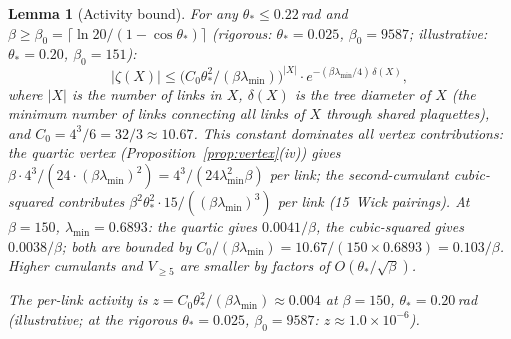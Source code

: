 \documentclass[11pt]{article}
\newtheorem{lemma}[theorem]{Lemma}
\theoremstyle{definition}
\begin{document}
\begin{lemma}[Activity bound]\label{lem:activity}
For any $\theta_*\le 0.22$\,rad and $\beta\ge\beta_0
=\lceil\ln 20/(1-\cos\theta_*)\rceil$
(rigorous: $\theta_*=0.025$, $\beta_0=9587$;
illustrative: $\theta_*=0.20$, $\beta_0=151$):
\begin{equation}
|\zeta(X)|\le\bigl(C_0\theta_*^2/(\beta\lambda_{\min})\bigr)^{|X|}
\cdot e^{-(\beta\lambda_{\min}/4)\,\delta(X)},
\end{equation}
where $|X|$ is the number of links in $X$, $\delta(X)$ is the
tree diameter of $X$ (the minimum number of links connecting all
links of $X$ through shared plaquettes), and
$C_0=4^3/6=32/3\approx 10.67$.  This constant dominates
all vertex contributions: the quartic vertex
(Proposition~\ref{prop:vertex}(iv)) gives
$\beta\cdot 4^3/(24\cdot(\beta\lambda_{\min})^2)
=4^3/(24\lambda_{\min}^2\beta)$ per link; the second-cumulant
cubic-squared contributes
$\beta^2\theta_*^2\cdot 15/((\beta\lambda_{\min})^3)$ per link
(15~Wick pairings).  At $\beta=150$, $\lambda_{\min}=0.6893$:
the quartic gives $0.0041/\beta$, the cubic-squared gives
$0.0038/\beta$; both are bounded by
$C_0/(\beta\lambda_{\min})=10.67/(150\times 0.6893)=0.103/\beta$.
Higher cumulants and $V_{\ge 5}$ are smaller by factors of
$O(\theta_*/\sqrt{\beta})$.

The per-link activity is $z=C_0\theta_*^2/(\beta\lambda_{\min})
\approx 0.004$ at $\beta=150$, $\theta_*=0.20$\,rad
(illustrative; at the rigorous $\theta_*=0.025$, $\beta_0=9587$:
$z\approx 1.0\times 10^{-6}$).
\end{lemma}
\end{document}
